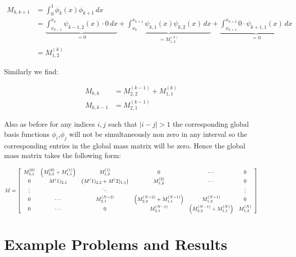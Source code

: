 \begin{align*}
	M_{k,k+1} &= \int_0^1\phi_k(x)\phi_{k+1}\, dx \\
              &= \underbrace{\int_{x_{k-1}}^{x_k}\psi_{k-1,2}(x) \cdot 0\, dx}_{ = 0}
               + \underbrace{\int_{x_k}^{x_{k+1}}\psi_{k,1}(x)\psi_{k,2}(x)\, dx}_{= M^{(k)}_{1,2}}
               + \underbrace{\int_{x_{k+1}}^{x_{k+2}}0 \cdot \psi_{k+1,1}(x)\, dx}_{= 0} \\
              &= M^{(k)}_{1,2}
\end{align*}

Similarly we find:

\begin{align*}
	M_{k,k} &= M^{(k-1)}_{2,2} + M^{(k)}_{1,1} \\
    M_{k,k-1} &= M^{(k-1)}_{2,1}
\end{align*}

Also as before for any indices $i,j$ such that $|i - j| > 1$ the corresponding global basis functions $\phi_i$,$\phi_j$
will not be simultaneously non zero in any interval so the corresponding entries in the global mass matrix will be zero. Hence
the global mass matrix takes the following form:

\begin{equation}\label{eq:oned-deterministic-global-mass}
	M = \left[\begin{array}{c c c c c c}
    		M^{(0)}_{2,1} & \left(M^{(0)}_{2,2} + M^{(1)}_{1,1}\right) & M^{(1)}_{1,2} & 0 & \cdots & 0 \\
            0 & M^(1)_{2,1} & \left(M^(1)_{2,2} + M^(2)_{1,1}\right) & M^{(2)}_{1,2} & \cdots & 0 \\
            \vdots & & \ddots & & & \vdots \\
            0 & \cdots & M^{(N-2)}_{2,1} & \left(M^{(N-2)}_{2,2} + M^{(N-1)}_{1,1}\right) & M^{(N-1)}_{1,2} & 0  \\
            0 &\cdots & 0 & M^{(N-1)}_{2,1} & \left(M^{(N-1)}_{2,2} + M^{(N)}_{1,1}\right) & M^{(N)}_{1,2}
        \end{array}\right]
\end{equation}

\section{Example Problems and Results}